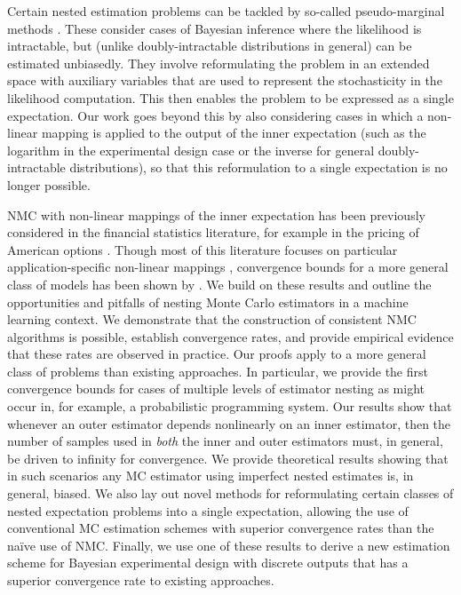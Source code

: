 Certain nested estimation problems can be tackled by so-called pseudo-marginal methods
\citep{beaumont2003estimation,andrieu2009pseudo,andrieu2010particle,
	andrieu2015convergence,andersson2015nested}.
These consider cases of Bayesian inference where the likelihood is intractable, 
but (unlike doubly-intractable distributions in general) can
be estimated unbiasedly.
They involve reformulating the problem in an extended space with auxiliary variables that
are used to represent the stochasticity in the likelihood computation. This then enables the
problem to be expressed as a single expectation.
Our work goes beyond this by also considering cases in which a non-linear mapping is
applied to the output of the inner expectation (such as the logarithm in the 
experimental design case or the inverse for general doubly-intractable distributions), so that 
this reformulation to a single expectation is no longer possible.

NMC with non-linear mappings of the inner expectation has been previously considered in
the financial statistics literature, for example in the pricing of American
options \citep{longstaff2001valuing}. Though most of this literature focuses on
particular application-specific non-linear mappings \citep{broadie2011efficient,gordy2010nested},
convergence bounds for a more general class of models
has been shown by \citet{hong2009estimating}.
We build on these results and outline the opportunities and pitfalls of nesting Monte Carlo
estimators in a machine learning context.
We demonstrate that the construction of consistent NMC algorithms is possible,
establish convergence rates, and provide
empirical evidence that these rates are observed in practice.
Our proofs apply to a more general class of problems than existing approaches.
In particular, we provide the first convergence bounds for cases of multiple levels of estimator nesting
as might occur in, for example, a probabilistic programming system.
Our results show that whenever an outer estimator depends nonlinearly on an inner
estimator, then the number of samples used in \emph{both} the inner and outer estimators
must, in general, be driven to infinity for convergence.  
We provide theoretical results showing that in such scenarios any MC
estimator using imperfect nested estimates is, in general, biased.
We also lay out novel methods for reformulating certain classes of nested expectation problems
into a single expectation, allowing the use of conventional MC estimation 
schemes with superior convergence rates than the na\"{i}ve use of NMC.  Finally, we use one of these results 
to derive a new estimation scheme for Bayesian experimental design with discrete outputs that has 
a superior convergence rate to existing approaches.

